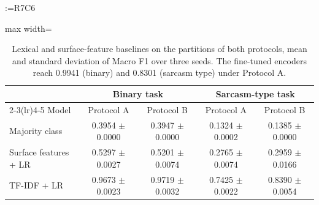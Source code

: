 \documentclass[a4paper,fleqn]{cas-sc}
\makeatletter
\newif\iftracked
\newcommand{\rv@setcolour}[1]{%
  \IfStrEq{#1}{R7C7}{\color{rvEdit}}{%
    \IfSubStr{#1}{R5}{\IfSubStr{#1}{R7}{\color{rvBoth}}{\color{rvFive}}}{\color{rvSeven}}}}
\newcommand{\rv@tag}[1]{\textsuperscript{\sffamily\bfseries\scriptsize[\StrSubstitute{#1}{,}{, }]}\,}
\newcommand{\rv@recordone}[1]{%
  \edef\rv@i{#1}%
  \ifcsdef{rv@n@\rv@i}{}{\csgdef{rv@n@\rv@i}{0}}%
  \csxdef{rv@n@\rv@i}{\the\numexpr\csuse{rv@n@\rv@i}+1\relax}%
  \begingroup\edef\@currentlabel{\rv@i}\label{rv:\rv@i:\csuse{rv@n@\rv@i}}\endgroup}
\newcommand{\rv@record}[1]{\@for\rv@id:=#1\do{\expandafter\rv@recordone\expandafter{\rv@id}}}
\DeclareRobustCommand{\rcx}[2]{\iftracked{\rv@setcolour{#1}\rv@tag{#1}#2}\else#2\fi}
\DeclareRobustCommand{\rcmark}[1]{\rv@record{#1}}
\makeatother
\begin{document}
\begin{table}[t]
\caption{\rcx{R7C6}{Lexical and surface-feature baselines on the partitions of both protocols, mean and standard deviation of Macro F1 over three seeds. The fine-tuned encoders reach 0.9941 (binary) and 0.8301 (sarcasm type) under Protocol A.}}
\rcmark{R7C6}
\label{tab:baselines}
\centering\small
\iftracked\color{rvSeven}\fi
\begin{adjustbox}{max width=\textwidth}
\begin{tabular}{lcccc}
\toprule
 & \multicolumn{2}{c}{Binary task} & \multicolumn{2}{c}{Sarcasm-type task} \\
\cmidrule(lr){2-3}\cmidrule(lr){4-5}
Model & Protocol A & Protocol B & Protocol A & Protocol B \\
\midrule
Majority class & 0.3954 $\pm$ 0.0000 & 0.3947 $\pm$ 0.0000 & 0.1324 $\pm$ 0.0002 & 0.1385 $\pm$ 0.0000 \\
Surface features + LR & 0.5297 $\pm$ 0.0027 & 0.5201 $\pm$ 0.0074 & 0.2765 $\pm$ 0.0074 & 0.2959 $\pm$ 0.0166 \\
TF-IDF + LR & 0.9673 $\pm$ 0.0023 & 0.9719 $\pm$ 0.0032 & 0.7425 $\pm$ 0.0022 & 0.8390 $\pm$ 0.0054 \\
\bottomrule
\end{tabular}
\end{adjustbox}
\end{table}
\end{document}
